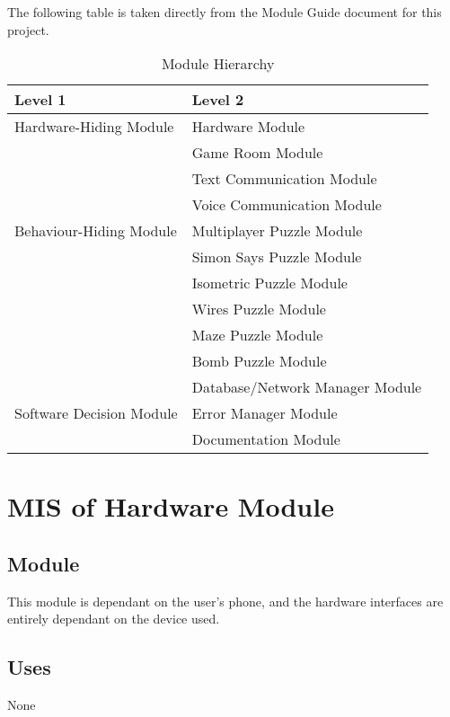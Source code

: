 \documentclass[12pt, titlepage]{article}
\begin{document}
The following table is taken directly from the Module Guide document for this project.

\begin{table}[h!]
\centering
\begin{tabular}{p{} p{}}
\toprule
\textbf{Level 1} & \textbf{Level 2}\\
\midrule

{Hardware-Hiding Module} & Hardware Module \\
\midrule

\multirow{7}{0.3\textwidth}{Behaviour-Hiding Module}
& Game Room Module\\
& Text Communication Module\\
& Voice Communication Module\\
& Multiplayer Puzzle Module\\
& Simon Says Puzzle Module\\
& Isometric Puzzle Module\\
& Wires Puzzle Module\\
& Maze Puzzle Module\\
& Bomb Puzzle Module\\
\midrule

\multirow{3}{0.3\textwidth}{Software Decision Module} & Database/Network Manager Module\\
& Error Manager Module\\
& Documentation Module\\
\bottomrule

\end{tabular}
\caption{Module Hierarchy}
\label{TblMH}
\end{table}

\newpage

\section{MIS of {Hardware Module}} \label{sec:HardwareModule} 

\subsection{Module}

This module is dependant on the user's phone, and the hardware interfaces are entirely dependant on the device used. 

\subsection{Uses}
 None
\end{document}

